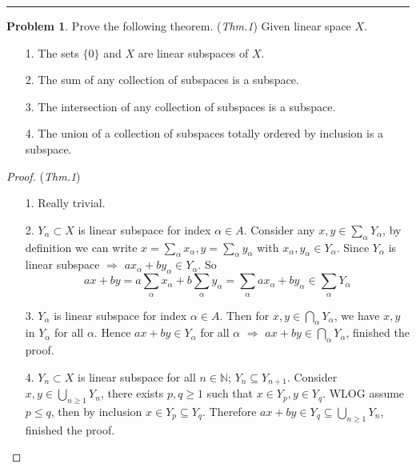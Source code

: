 \documentclass[a4paper, 10pt]{article}
\theoremstyle{definition}
\newtheorem{problem}{Problem}
\theoremstyle{hSol}
\begin{document}
\noindent\rule{16cm}{0.4pt}

\begin{problem} Prove the following theorem. (\textit{Thm.1}) Given linear space $X$.
\begin{itemize}
  \item[1.] The sets $\{0\}$ and $X$ are linear subspaces of $X$.
  \item[2.] The sum of any collection of subspaces is a subspace.
  \item[3.] The intersection of any collection of subspaces is a subspace.
  \item[4.] The union of a collection of subspaces totally ordered by inclusion is a subspace.
\end{itemize}
\end{problem}
\begin{proof} (\textit{Thm.1})
\begin{itemize}
  \item[] 1. Really trivial.
  \item[] 2. $Y_{\alpha}\subset X$ is linear subspace for index $\alpha \in A$. Consider any $x,y \in \sum_{\alpha} Y_{\alpha}$, by definition we can write $x=\sum_{\alpha} x_{\alpha}, y=\sum_{\alpha} y_{\alpha}$ with $x_{\alpha}, y_{\alpha}\in Y_{\alpha}$. Since $Y_{\alpha}$ is linear subspace $\Rightarrow$ $a x_{\alpha} + b y_{\alpha} \in Y_{\alpha}$. So
  \begin{equation}
    ax + by = a\sum_{\alpha} x_{\alpha} + b\sum_{\alpha} y_{\alpha} = \sum_{\alpha} ax_{\alpha} + by_{\alpha} \in \sum_{\alpha} Y_{\alpha}
  \end{equation}
  \item[] 3. $Y_{\alpha}$ is linear subspace for index $\alpha \in A$. Then for $x,y \in \bigcap_{\alpha} Y_{\alpha}$, we have $x,y$ in $Y_{\alpha}$ for all $\alpha$. Hence $ax+by \in Y_{\alpha}$ for all $\alpha$ $\Rightarrow$ $ax+by \in \bigcap_{\alpha} Y_{\alpha}$, finished the proof.
  \item[] 4. $Y_n \subset X$ is linear subspace for all $n\in \mathbb{N}$; $Y_n \subseteq Y_{n+1}$. Consider $x,y \in \bigcup_{n\geq 1} Y_n$, there exists $p,q\geq 1$ such that $x\in Y_p, y\in Y_q$. WLOG assume $p\leq q$, then by inclusion $x\in Y_p \subseteq Y_q$. Therefore $ax+by \in Y_q \subseteq \bigcup_{n\geq1} Y_n$, finished the proof.
\end{itemize}

\end{proof}
\end{document}
